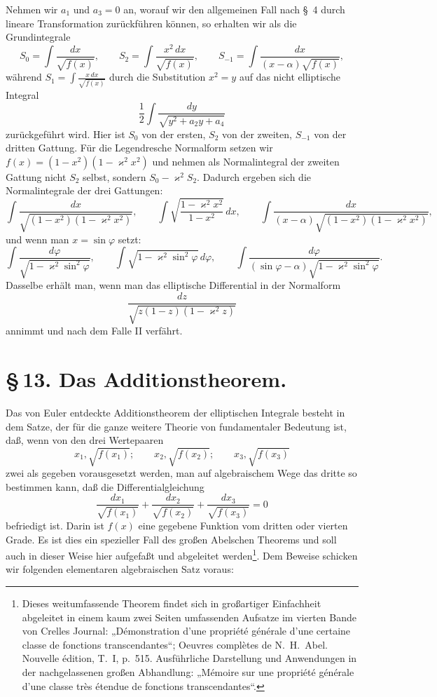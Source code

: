 \documentclass[11pt]{article}
\begin{document}
Nehmen wir $a_1$ und $a_3=0$ an, worauf wir den allgemeinen Fall nach \S~4 durch lineare Transformation zurückführen können, so erhalten wir als die Grundintegrale
\[
S_0=\int\frac{dx}{\sqrt{f(x)}},\qquad
S_2=\int\frac{x^2\,dx}{\sqrt{f(x)}},\qquad
S_{-1}=\int\frac{dx}{(x-\alpha)\sqrt{f(x)}},
\]
während $S_1=\int\frac{x\,dx}{\sqrt{f(x)}}$ durch die Substitution $x^2=y$ auf das nicht elliptische Integral
\[
\frac12\int\frac{dy}{\sqrt{y^2+a_2y+a_4}}
\]
zurückgeführt wird. Hier ist $S_0$ von der ersten, $S_2$ von der zweiten, $S_{-1}$ von der dritten Gattung. Für die Legendresche Normalform setzen wir $f(x)=(1-x^2)(1-\varkappa^2x^2)$ und nehmen als Normalintegral der zweiten Gattung nicht $S_2$ selbst, sondern $S_0-\varkappa^2S_2$. Dadurch ergeben sich die Normalintegrale der drei Gattungen:
\[
\int\frac{dx}{\sqrt{(1-x^2)(1-\varkappa^2x^2)}},\qquad
\int\sqrt{\frac{1-\varkappa^2x^2}{1-x^2}}\,dx,\qquad
\int\frac{dx}{(x-\alpha)\sqrt{(1-x^2)(1-\varkappa^2x^2)}},
\]
und wenn man $x=\sin\varphi$ setzt:
\[
\int\frac{d\varphi}{\sqrt{1-\varkappa^2\sin^2\varphi}},\qquad
\int\sqrt{1-\varkappa^2\sin^2\varphi}\,d\varphi,\qquad
\int\frac{d\varphi}{(\sin\varphi-\alpha)\sqrt{1-\varkappa^2\sin^2\varphi}}.
\]
Dasselbe erhält man, wenn man das elliptische Differential in der Normalform
\[
\frac{dz}{\sqrt{z(1-z)(1-\varkappa^2z)}}
\]
annimmt und nach dem Falle II verfährt.

\section*{\S\,13. Das Additionstheorem.}

Das von Euler entdeckte Additionstheorem der elliptischen Integrale besteht in dem Satze, der für die ganze weitere Theorie von fundamentaler Bedeutung ist, daß, wenn von den drei Wertepaaren
\[
x_1,\sqrt{f(x_1)};\qquad x_2,\sqrt{f(x_2)};\qquad x_3,\sqrt{f(x_3)}
\]
zwei als gegeben vorausgesetzt werden, man auf algebraischem Wege das dritte so bestimmen kann, daß die Differentialgleichung
\begin{equation}
\frac{dx_1}{\sqrt{f(x_1)}}+
\frac{dx_2}{\sqrt{f(x_2)}}+
\frac{dx_3}{\sqrt{f(x_3)}}=0
\tag{1}
\end{equation}
befriedigt ist. Darin ist $f(x)$ eine gegebene Funktion vom dritten oder vierten Grade. Es ist dies ein spezieller Fall des großen Abelschen Theorems und soll auch in dieser Weise hier aufgefaßt und abgeleitet werden\footnote{Dieses weitumfassende Theorem findet sich in großartiger Einfachheit abgeleitet in einem kaum zwei Seiten umfassenden Aufsatze im vierten Bande von Crelles Journal: „Démonstration d'une propriété générale d'une certaine classe de fonctions transcendantes“; Oeuvres complètes de N.~H.~Abel. Nouvelle édition, T.~I, p.~515. Ausführliche Darstellung und Anwendungen in der nachgelassenen großen Abhandlung: „Mémoire sur une propriété générale d'une classe très étendue de fonctions transcendantes“.}. Dem Beweise schicken wir folgenden elementaren algebraischen Satz voraus:
\end{document}

